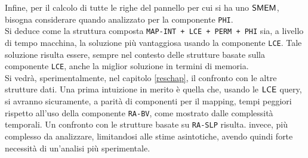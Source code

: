 Infine, per il calcolo di tutte le righe del pannello per cui si ha uno
$\mbox{\rm {\sf SMEM}}$, bisogna considerare quando analizzato per la componente
\texttt{PHI}.\\ 
Si deduce come la struttura composta \texttt{MAP-INT + LCE + PERM + PHI}
sia, a 
livello di tempo macchina, la soluzione più vantaggiosa usando la componente
\texttt{LCE}. Tale soluzione risulta essere, sempre nel contesto delle strutture
basate 
sulla componente \texttt{LCE}, anche la miglior soluzione in
termini di memoria.\\
Si vedrà, sperimentalmente, nel capitolo \ref{reschap}, il
confronto con le altre strutture dati. Una prima intuizione in merito è quella
che, usando le $\mbox{\rm {\sf LCE}}$ query, si avranno sicuramente, a parità di componenti per
il mapping, tempi peggiori rispetto
all'uso della componente \texttt{RA-BV}, come mostrato dalle complessità
temporali. Un confronto con le strutture basate su \texttt{RA-SLP} risulta.
invece, più complesso da analizzare, limitandosi alle stime asintotiche, avendo
quindi forte necessità di un'analisi più sperimentale.
